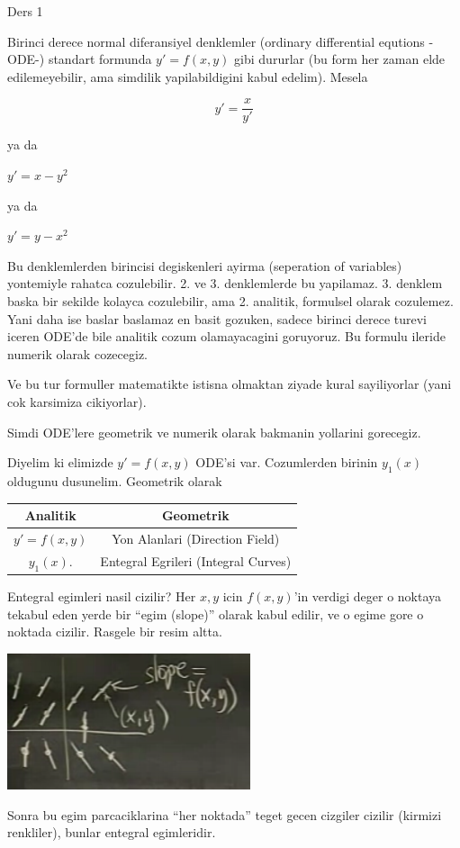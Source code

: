 \documentclass[12pt,fleqn]{article}\usepackage{../common}
\begin{document}
Ders 1

Birinci derece normal diferansiyel denklemler (ordinary differential equtions
-ODE-) standart formunda $y'=f(x,y)$ gibi dururlar (bu form her zaman
elde edilemeyebilir, ama simdilik yapilabildigini kabul edelim).  Mesela

\[ y' = \frac{x}{y'} \] 

ya da

$y' = x-y^2$ 

ya da

$y' = y-x^2$

Bu denklemlerden birincisi degiskenleri ayirma (seperation of variables)
yontemiyle rahatca cozulebilir. 2. ve 3. denklemlerde bu yapilamaz. 3. denklem
baska bir sekilde kolayca cozulebilir, ama 2. analitik, formulsel olarak
cozulemez. Yani daha ise baslar baslamaz en basit gozuken, sadece birinci derece
turevi iceren ODE'de bile analitik cozum olamayacagini goruyoruz. Bu formulu
ileride numerik olarak cozecegiz.

Ve bu tur formuller matematikte istisna olmaktan ziyade kural sayiliyorlar (yani
cok karsimiza cikiyorlar). 

Simdi ODE'lere geometrik ve numerik olarak bakmanin yollarini gorecegiz.

Diyelim ki elimizde $y' = f(x,y)$ ODE'si var. Cozumlerden birinin
$y_1(x)$ oldugunu dusunelim. Geometrik olarak 

\begin{tabular}{cc}
Analitik & Geometrik \\ \hline
$y' = f(x,y)$ & Yon Alanlari (Direction Field) \\
$y_1(x)$. & Entegral Egrileri (Integral Curves)
\end{tabular}

Entegral egimleri nasil cizilir? Her $x,y$ icin $f(x,y)$'in verdigi deger o
noktaya tekabul eden yerde bir ``egim (slope)'' olarak kabul edilir, ve o egime
gore o noktada cizilir. Rasgele bir resim altta.

\includegraphics[height=4cm]{./1_1.png}

Sonra bu egim parcaciklarina ``her noktada'' teget gecen cizgiler cizilir
(kirmizi renkliler), bunlar entegral egimleridir.
\end{document}
